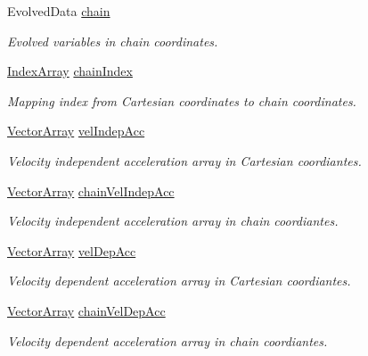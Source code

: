 \begin{DoxyCompactItemize}
\item 
Evolved\+Data \mbox{\hyperlink{class_a_rchain_af7780024bfc1beca5f5622086b909db2}{chain}}
\begin{DoxyCompactList}\small\item\em Evolved variables in chain coordinates. \end{DoxyCompactList}\item 
\mbox{\hyperlink{class_a_rchain_aae40d4b5881eecfc960814f9e368215d}{Index\+Array}} \mbox{\hyperlink{class_a_rchain_a0691e6612b661e329f1fc72d4cb7c895}{chain\+Index}}
\begin{DoxyCompactList}\small\item\em Mapping index from Cartesian coordinates to chain coordinates. \end{DoxyCompactList}\item 
\mbox{\hyperlink{class_a_rchain_a019fbadb9f4e5892736d9127537338bb}{Vector\+Array}} \mbox{\hyperlink{class_a_rchain_a9359b4fb9f08ad849b0f1dfbdf661016}{vel\+Indep\+Acc}}
\begin{DoxyCompactList}\small\item\em Velocity independent acceleration array in Cartesian coordiantes. \end{DoxyCompactList}\item 
\mbox{\hyperlink{class_a_rchain_a019fbadb9f4e5892736d9127537338bb}{Vector\+Array}} \mbox{\hyperlink{class_a_rchain_a80d060a3341913f94c4bbbf2e2321b1d}{chain\+Vel\+Indep\+Acc}}
\begin{DoxyCompactList}\small\item\em Velocity independent acceleration array in chain coordiantes. \end{DoxyCompactList}\item 
\mbox{\hyperlink{class_a_rchain_a019fbadb9f4e5892736d9127537338bb}{Vector\+Array}} \mbox{\hyperlink{class_a_rchain_a3c3a74f839bbfe5cbe1d8eb239dd8cc1}{vel\+Dep\+Acc}}
\begin{DoxyCompactList}\small\item\em Velocity dependent acceleration array in Cartesian coordiantes. \end{DoxyCompactList}\item 
\mbox{\hyperlink{class_a_rchain_a019fbadb9f4e5892736d9127537338bb}{Vector\+Array}} \mbox{\hyperlink{class_a_rchain_a64087e0cb9cdb6b118b4a6e416d9f012}{chain\+Vel\+Dep\+Acc}}
\begin{DoxyCompactList}\small\item\em Velocity dependent acceleration array in chain coordiantes. \end{DoxyCompactList}\item 

\end{DoxyCompactItemize}
